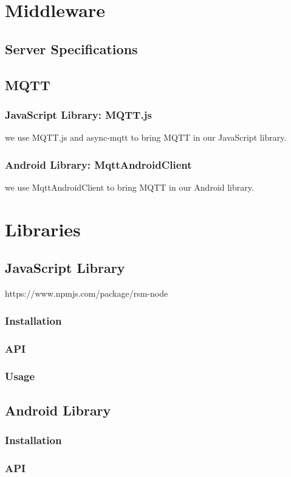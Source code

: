 \section{Middleware}
\subsection{Server Specifications}
\subsection{MQTT}
\subsubsection{JavaScript Library: MQTT.js}
we use MQTT.js and async-mqtt to bring MQTT in our JavaScript library.
\subsubsection{Android Library: MqttAndroidClient}
we use MqttAndroidClient to bring MQTT in our Android library.

\section{Libraries}
\subsection{JavaScript Library}
https://www.npmjs.com/package/rsm-node

\subsubsection{Installation}
\subsubsection{API}
\subsubsection{Usage}
\subsection{Android Library}
\subsubsection{Installation}
\subsubsection{API}
